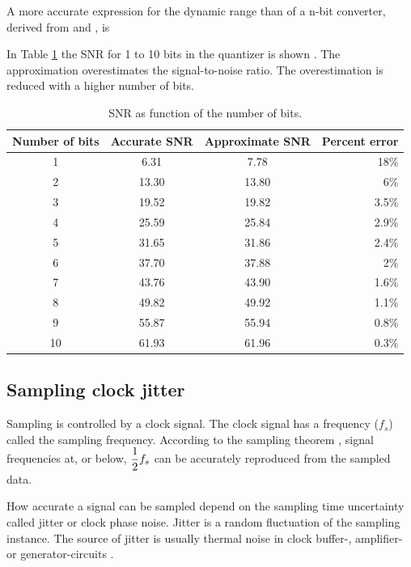 A more accurate expression for the dynamic range than  of a n-bit
converter, derived from  and , is

In Table \ref{tab:snr_accurate_vs_approximation} the SNR for 1 to 10
bits in the quantizer is shown \cite{plassche}. The approximation 
overestimates the signal-to-noise ratio. The overestimation is reduced
with a higher number of bits.

\begin{table}[ht]
\centering 
\begin{tabular}{c|c|c|r}
\label{tab:snr_accurate_vs_approximation}
Number of bits&Accurate SNR&Approximate SNR&Percent error\\
\hline 
1&6.31&7.78 & 18\%\\
2&13.30&13.80 & 6\% \\
3&19.52&19.82 & 3.5\%\\
4&25.59&25.84 & 2.9\%\\
5&31.65&31.86 & 2.4\%\\
6&37.70&37.88 & 2\%\\
7&43.76&43.90 & 1.6\%\\
8&49.82&49.92 & 1.1\%\\
9&55.87&55.94 & 0.8\%\\
10&61.93&61.96 & 0.3\%
\end{tabular}
\caption{SNR as function of the number of bits.}
\end{table}

\subsection{Sampling clock jitter}
Sampling is
controlled by a clock signal. The clock signal has a frequency ($f_s$)
called the sampling frequency. According to the sampling theorem \cite{shannon49}, signal frequencies at, or below,
$\dfrac{1}{2}{f_s}$ can be accurately reproduced from the sampled
data. 

How accurate a signal can be sampled depend on the sampling time
uncertainty called jitter or
clock phase noise. Jitter is a
random fluctuation of the sampling instance. The source of jitter is
usually thermal noise in clock buffer-, amplifier- or
generator-circuits \cite{plassche}. 

